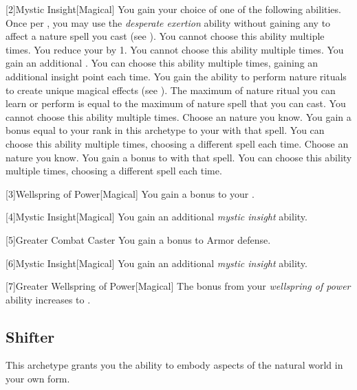         [2]{Mystic Insight}[Magical]
        You gain your choice of one of the following abilities.
        {
             Once per , you may use the \textit{desperate exertion} ability without gaining any  to affect a nature spell you cast (see ).
                You cannot choose this ability multiple times.
             You reduce your  by 1.
                You cannot choose this ability multiple times.
             You gain an additional .
                You can choose this ability multiple times, gaining an additional insight point each time.
             You gain the ability to perform nature rituals to create unique magical effects (see ).
                The maximum  of nature ritual you can learn or perform is equal to the maximum  of nature spell that you can cast.
                You cannot choose this ability multiple times.
             Choose an nature  you know.
                You gain a bonus equal to your rank in this archetype to your  with that spell.
                You can choose this ability multiple times, choosing a different spell each time.
             Choose an nature  you know.
                You gain a  bonus to  with that spell.
                You can choose this ability multiple times, choosing a different spell each time.
        }

        [3]{Wellspring of Power}[Magical]
        You gain a  bonus to your  .

        [4]{Mystic Insight}[Magical]
        You gain an additional \textit{mystic insight} ability.

        [5]{Greater Combat Caster} You gain a  bonus to Armor defense.

        [6]{Mystic Insight}[Magical]
        You gain an additional \textit{mystic insight} ability.

        [7]{Greater Wellspring of Power}[Magical]
        The bonus from your \textit{wellspring of power} ability increases to .

    \newpage
    \subsection{Shifter}\label{Shifter}
        This archetype grants you the ability to embody aspects of the natural world in your own form.

